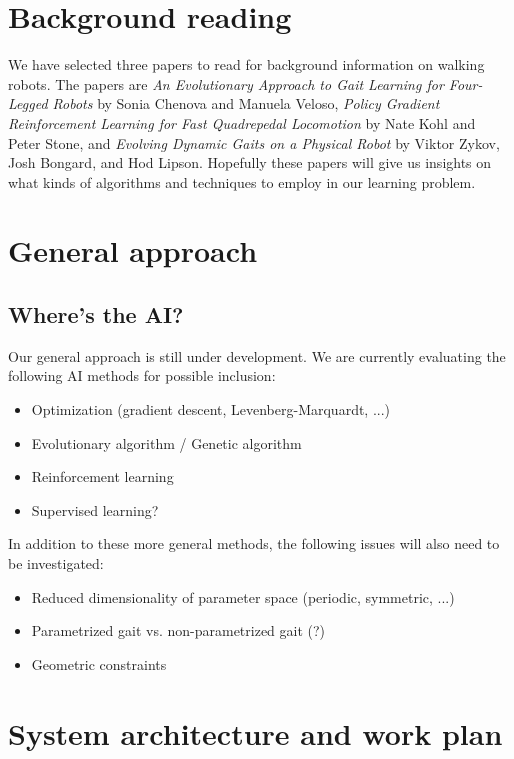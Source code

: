 \section{Background reading}

We have selected three papers to read for background information on
walking robots. The papers are \emph{An Evolutionary Approach to Gait
  Learning for Four-Legged Robots} by Sonia Chenova and Manuela
Veloso, \emph{Policy Gradient Reinforcement Learning for Fast
  Quadrepedal Locomotion} by Nate Kohl and Peter Stone, and
\emph{Evolving Dynamic Gaits on a Physical Robot} by Viktor Zykov,
Josh Bongard, and Hod Lipson. Hopefully these papers will give us
insights on what kinds of algorithms and techniques to employ in our
learning problem.




\section{General approach}

\subsection{Where's the AI?}

Our general approach is still under development.  We are currently
evaluating the following AI methods for possible inclusion:

\begin{itemize}
\item Optimization (gradient descent, Levenberg-Marquardt, ...)
\item Evolutionary algorithm / Genetic algorithm
\item Reinforcement learning
\item Supervised learning?
\end{itemize}

In addition to these more general methods, the following issues will
also need to be investigated:

\begin{itemize}
\item Reduced dimensionality of parameter space (periodic, symmetric, ...)
\item Parametrized gait vs. non-parametrized gait (?)
\item Geometric constraints
\end{itemize}



\section{System architecture and work plan}

